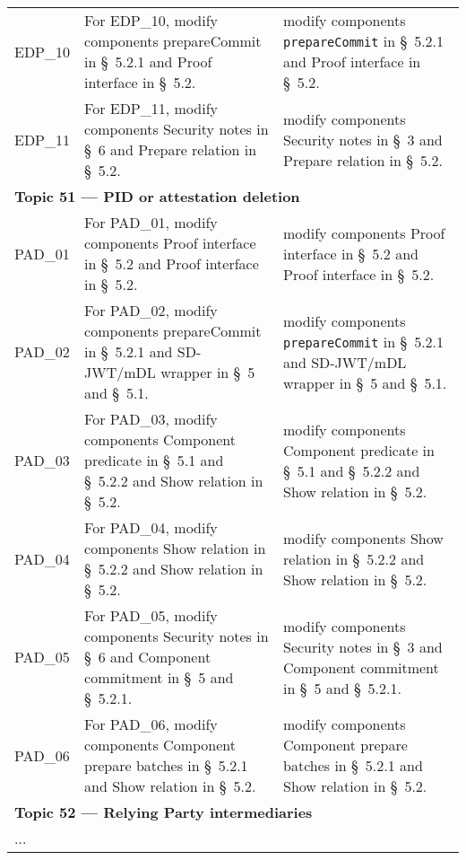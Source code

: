 \begin{landscape}
\begin{longtable}{p{3cm} p{10cm} p{7cm}}
EDP\_10 &
For EDP\_10, modify components prepareCommit in \S~5.2.1 and Proof interface in \S~5.2. &
modify components \texttt{prepareCommit} in \S~5.2.1 and Proof interface in \S~5.2. \\

EDP\_11 &
For EDP\_11, modify components Security notes in \S~6 and Prepare relation in \S~5.2. &
modify components Security notes in \S~3 and Prepare relation in \S~5.2. \\[1em]


\multicolumn{3}{l}{\textbf{Topic 51 — PID or attestation deletion}}\\

PAD\_01 &
For PAD\_01, modify components Proof interface in \S~5.2 and Proof interface in \S~5.2. &
modify components Proof interface in \S~5.2 and Proof interface in \S~5.2. \\

PAD\_02 &
For PAD\_02, modify components prepareCommit in \S~5.2.1 and SD-JWT/mDL wrapper in \S~5 and \S~5.1. &
modify components \texttt{prepareCommit} in \S~5.2.1 and SD-JWT/mDL wrapper in \S~5 and \S~5.1. \\

PAD\_03 &
For PAD\_03, modify components Component predicate in \S~5.1 and \S~5.2.2 and Show relation in \S~5.2. &
modify components Component predicate in \S~5.1 and \S~5.2.2 and Show relation in \S~5.2. \\

PAD\_04 &
For PAD\_04, modify components Show relation in \S~5.2.2 and Show relation in \S~5.2. &
modify components Show relation in \S~5.2.2 and Show relation in \S~5.2. \\

PAD\_05 &
For PAD\_05, modify components Security notes in \S~6 and Component commitment in \S~5 and \S~5.2.1. &
modify components Security notes in \S~3 and Component commitment in \S~5 and \S~5.2.1. \\

PAD\_06 &
For PAD\_06, modify components Component prepare batches in \S~5.2.1 and Show relation in \S~5.2. &
modify components Component prepare batches in \S~5.2.1 and Show relation in \S~5.2. \\[1em]


\multicolumn{3}{l}{\textbf{Topic 52 — Relying Party intermediaries}}\\

\multicolumn{3}{l}{...} \\

\end{longtable}
\end{landscape}



